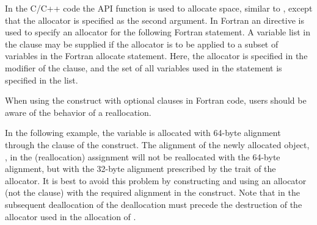 
In the C/C++ code the API   function is used
to allocate space, similar to , except that the allocator
is specified as the second argument.
In Fortran an  directive is used to specify an allocator
for the following Fortran  statement.
A variable list in the  clause may be supplied if the allocator
is to be applied to a subset of variables in the Fortran allocate
statement.
Here, the  allocator is specified
in the modifier of the  clause,
and the set of all variables used in the  statement is specified in the list.





When using the  construct with optional clauses in Fortran code, 
users should be aware of the behavior of a reallocation.

In the following example, the  variable is allocated with 64-byte
alignment through the  clause of the  construct.
The alignment of the newly allocated object, , in the (reallocation)
assignment  will not be reallocated with the 64-byte alignment, but
with the 32-byte alignment prescribed by the trait of the  
allocator. It is best to avoid this problem by constructing and using an
allocator (not the  clause) with the required alignment in 
the  construct.
Note that in the subsequent
deallocation of  the deallocation must precede the destruction
of the allocator used in the allocation of .


